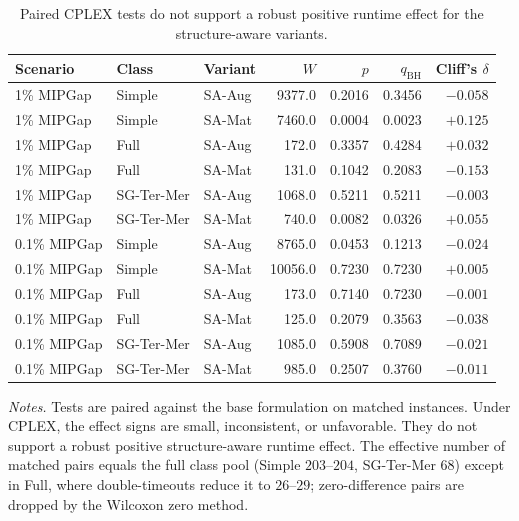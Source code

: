 \documentclass[AMA,Times1COL]{WileyNJDv5} %
\newcommand{\methodAug}{SA-Aug}
\newcommand{\methodMat}{SA-Mat}
\providecommand{\DIFaddbegin}{} %
\providecommand{\DIFaddend}{} %
\providecommand{\DIFdelend}{} %
\begin{document}
\DIFdelend \DIFaddbegin \begin{table}[t]
\centering
\caption{Paired CPLEX tests do not support a robust positive runtime effect for the structure-aware variants.}
\label{tab:wilcoxon-structured-cplex}
\small
\begin{tabular}{@{}lllrrrr@{}}
\toprule
Scenario & Class & Variant & $W$ & $p$ & $q_{\mathrm{BH}}$ & Cliff's $\delta$ \\
\midrule
1\% MIPGap & Simple & \methodAug & 9377.0 & 0.2016 & 0.3456 & $-0.058$ \\
1\% MIPGap & Simple & \methodMat & 7460.0 & 0.0004 & 0.0023 & $+0.125$ \\
1\% MIPGap & Full & \methodAug & 172.0 & 0.3357 & 0.4284 & $+0.032$ \\
1\% MIPGap & Full & \methodMat & 131.0 & 0.1042 & 0.2083 & $-0.153$ \\
1\% MIPGap & SG-Ter-Mer & \methodAug & 1068.0 & 0.5211 & 0.5211 & $-0.003$ \\
1\% MIPGap & SG-Ter-Mer & \methodMat & 740.0 & 0.0082 & 0.0326 & $+0.055$ \\
0.1\% MIPGap & Simple & \methodAug & 8765.0 & 0.0453 & 0.1213 & $-0.024$ \\
0.1\% MIPGap & Simple & \methodMat & 10056.0 & 0.7230 & 0.7230 & $+0.005$ \\
0.1\% MIPGap & Full & \methodAug & 173.0 & 0.7140 & 0.7230 & $-0.001$ \\
0.1\% MIPGap & Full & \methodMat & 125.0 & 0.2079 & 0.3563 & $-0.038$ \\
0.1\% MIPGap & SG-Ter-Mer & \methodAug & 1085.0 & 0.5908 & 0.7089 & $-0.021$ \\
0.1\% MIPGap & SG-Ter-Mer & \methodMat & 985.0 & 0.2507 & 0.3760 & $-0.011$ \\
\bottomrule
\end{tabular}
\begin{flushleft}\footnotesize
\emph{Notes.} Tests are paired against the base formulation on matched instances. Under
CPLEX, the effect signs are small, inconsistent, or unfavorable. They do not support a
robust positive structure-aware runtime effect. The effective number of matched pairs
equals the full class pool (Simple $203$--$204$, SG-Ter-Mer $68$) except in Full, where
double-timeouts reduce it to $26$--$29$; zero-difference pairs are dropped by the Wilcoxon
zero method.
\end{flushleft}
\end{table}
\DIFaddend 
\end{document}
